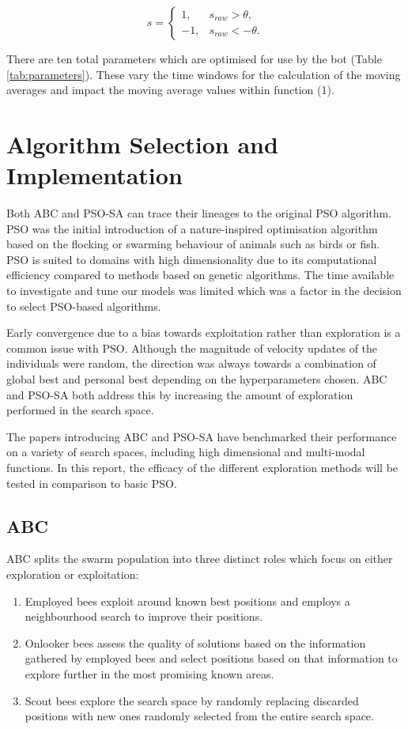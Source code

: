 \documentclass[a4paper, 12pt]{extarticle}
\begin{document}
\begin{equation}
s = 
\begin{cases}
1,      & s_{raw} > \theta,\\
-1,     & s_{raw} < -\theta.
\end{cases}
\end{equation}

There are ten total parameters which are optimised for use by the bot (Table \ref{tab:parameters}). These vary the time windows for the calculation of the moving averages and impact the moving average values within function (1).

\section{Algorithm Selection and Implementation}
Both ABC and PSO-SA can trace their lineages to the original PSO algorithm. PSO was the initial introduction of a nature-inspired optimisation algorithm based on the flocking or swarming behaviour of animals such as birds or fish. PSO is suited to domains with high dimensionality due to its computational efficiency compared to methods based on genetic algorithms. The time available to investigate and tune our models was limited which was a factor in the decision to select PSO-based algorithms. 

Early convergence due to a bias towards exploitation rather than exploration is a common issue with PSO. Although the magnitude of velocity updates of the individuals were random, the direction was always towards a combination of global best and personal best depending on the hyperparameters chosen. ABC and PSO-SA both address this by increasing the amount of exploration performed in the search space. 

The papers introducing ABC and PSO-SA have benchmarked their performance on a variety of search spaces, including high dimensional and multi-modal functions. In this report, the efficacy of the different exploration methods will be tested in comparison to basic  PSO. 

\subsection{ABC} 
ABC splits the swarm population into three distinct roles which focus on either exploration or exploitation: 

\begin{enumerate}
    \item Employed bees exploit around known best positions and employs a neighbourhood search to improve their positions. 
    \item Onlooker bees assess the quality of solutions based on the information gathered by employed bees and select positions based on that information to explore further in the most promising known areas.
    \item Scout bees explore the search space by randomly replacing discarded positions with new ones randomly selected from the entire search space. 
\end{enumerate}
\end{document}

